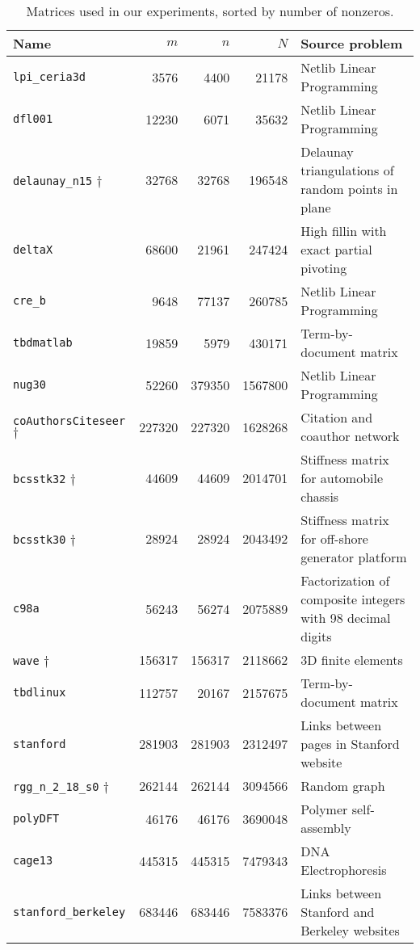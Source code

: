 \begin{table}[h]
	\centering
	\begin{tabular}{|l|r|r|r|p{7cm} |}
		\hline	
		\textbf{Name} & \textbf{$m$} & \textbf{$n$} & \textbf{$N$} & \textbf{Source problem} \\ \hline
		\verb|lpi_ceria3d| 									& 3576 		& 4400 		& 21178 & Netlib Linear Programming \\
		\verb|dfl001| 											& 12230 	& 6071 		& 35632 & Netlib Linear Programming \\ 
		\verb|delaunay_n15| $\dagger$ 			& 32768 	& 32768 	& 196548 & Delaunay triangulations of random points in plane \\ 
		\verb|deltaX| 											& 68600 	& 21961 	& 247424 & High fillin with exact partial pivoting \\
		\verb|cre_b| 												& 9648 		& 77137 	& 260785 & Netlib Linear Programming \\ 
		\verb|tbdmatlab| 										& 19859 	& 5979 		& 430171 & Term-by-document matrix \\ 
		\verb|nug30| 												& 52260 	& 379350 	& 1567800 & Netlib Linear Programming \\ 
		\verb|coAuthorsCiteseer| $\dagger$ 	& 227320 	& 227320 	& 1628268 & Citation and coauthor network\\ 
		\verb|bcsstk32| $\dagger$ 					& 44609 	& 44609 	& 2014701 & Stiffness matrix for automobile chassis \\ 
		\verb|bcsstk30| $\dagger$						& 28924 	& 28924 	& 2043492 & Stiffness matrix for off-shore generator platform \\
		\verb|c98a| 												& 56243 	& 56274 	& 2075889 & Factorization of composite integers with 98 decimal digits  \\ 
		\verb|wave| 	$\dagger$							& 156317 	& 156317 	& 2118662 & 3D finite elements \\
		\verb|tbdlinux| 										& 112757 	& 20167 	& 2157675 & Term-by-document matrix \\
		\verb|stanford| 										& 281903 	& 281903 	& 2312497 & Links between pages in Stanford website \\
		\verb|rgg_n_2_18_s0| $\dagger$ 			& 262144 	& 262144 	& 3094566 & Random graph \\
		\verb|polyDFT| 											& 46176 	& 46176 	& 3690048 & Polymer self-assembly \\ 
		\verb|cage13| 											& 445315 	& 445315 	& 7479343 & DNA Electrophoresis \\
		\verb|stanford_berkeley| 						& 683446 	& 683446 	& 7583376 & Links between Stanford and Berkeley websites \\
		\hline
	\end{tabular}
	\caption{Matrices used in our experiments, sorted by number of nonzeros.} \label{tab:matrices}
\end{table}

